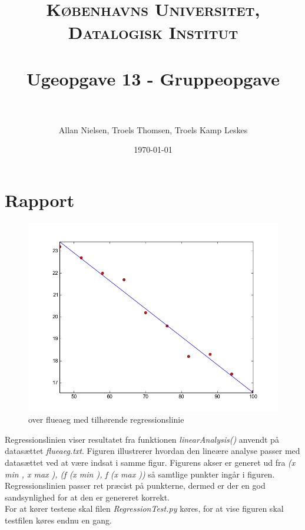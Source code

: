 \documentclass[paper=a4, fontsize=11pt]{scrartcl} %
\title{	
\normalfont \normalsize 
\textsc{Københavns Universitet, Datalogisk Institut} \\ [25pt] %
\horrule{0.5pt} \\[0.4cm] %
\huge Ugeopgave 13 - Gruppeopgave \\ %
\horrule{2pt} \\[0.5cm] %
}
\author{Allan Nielsen, Troels Thomsen, Troels Kamp Leskes} %
\date{\normalsize\today} %
\numberwithin{equation}{section} %
\numberwithin{figure}{section} %
\numberwithin{table}{section} %
\begin{document}
\maketitle %

\section*{Rapport}

\begin{figure}[h!]
  \centering
    \includegraphics[width=.8\textwidth]{figure_1}
  \caption{over flueaeg med tilhørende regressionslinie}
\end{figure}
\pagebreak

Regressionslinien viser resultatet fra funktionen \textit{linearAnalysis()} anvendt på datasættet \textit{flueaeg.txt}. Figuren illustrerer hvordan den lineære analyse passer med datasættet ved at være indsat i samme figur. Figurens akser er generet ud fra \textit{(x min , x max ), (f (x min ), f (x max ))}
så samtlige punkter ingår i figuren. Regressionslinien passer ret præcist på punkterne, dermed er der en god sandsynlighed for at den er genereret korrekt. \\
For at kører testene skal filen \textit{RegressionTest.py} køres, for at vise figuren skal testfilen køres endnu en gang. 
\end{document}

